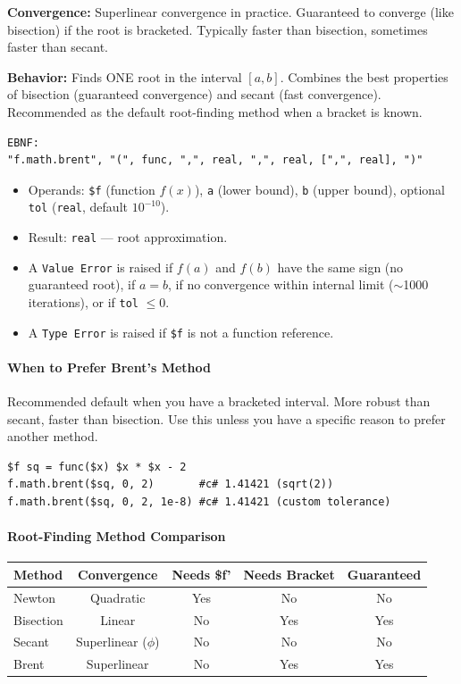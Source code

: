 \textbf{Convergence:} Superlinear convergence in practice. Guaranteed to converge (like bisection) if the root is bracketed. Typically faster than bisection, sometimes faster than secant.

\textbf{Behavior:} Finds ONE root in the interval $[a, b]$. Combines the best properties of bisection (guaranteed convergence) and secant (fast convergence). Recommended as the default root-finding method when a bracket is known.

\begin{verbatim}
EBNF:
"f.math.brent", "(", func, ",", real, ",", real, [",", real], ")"
\end{verbatim}
\begin{itemize}
\item Operands: \texttt{\$f} (function $f(x)$), \texttt{a} (lower bound), \texttt{b} (upper bound), optional \texttt{tol} (\texttt{real}, default $10^{-10}$).
\item Result: \texttt{real} --- root approximation.
\item A \texttt{Value Error} is raised if $f(a)$ and $f(b)$ have the same sign (no guaranteed root), if $a = b$, if no convergence within internal limit ($\sim$1000 iterations), or if \texttt{tol} $\leq 0$.
\item A \texttt{Type Error} is raised if \texttt{\$f} is not a function reference.
\end{itemize}

\paragraph{When to Prefer Brent's Method}
Recommended default when you have a bracketed interval. More robust than secant, faster than bisection. Use this unless you have a specific reason to prefer another method.

\begin{verbatim}
$f sq = func($x) $x * $x - 2
f.math.brent($sq, 0, 2)       #c# 1.41421 (sqrt(2))
f.math.brent($sq, 0, 2, 1e-8) #c# 1.41421 (custom tolerance)
\end{verbatim}

\paragraph{Root-Finding Method Comparison}

\begin{center}
\begin{tabular}{|l|c|c|c|c|}
\hline
\textbf{Method} & \textbf{Convergence} & \textbf{Needs \$f'} & \textbf{Needs Bracket} & \textbf{Guaranteed} \\
\hline
Newton & Quadratic & Yes & No & No \\
Bisection & Linear & No & Yes & Yes \\
Secant & Superlinear ($\phi$) & No & No & No \\
Brent & Superlinear & No & Yes & Yes \\
\hline
\end{tabular}
\end{center}

